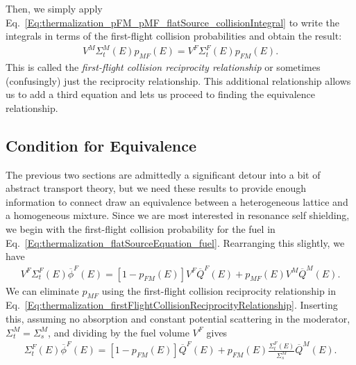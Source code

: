 Then, we simply apply Eq.~\eqref{Eq:thermalization_pFM_pMF_flatSource_collisionIntegral} to write the integrals in terms of the first-flight collision probabilities and obtain the result:
\begin{align}
  V^M \Sigma_t^M(E)  p_{MF}(E)  = V^F \Sigma_t^F(E) p_{FM}(E). \label{Eq:thermalization_firstFlightCollisionReciprocityRelationship}
\end{align}
This is called the \emph{first-flight collision reciprocity relationship} or sometimes (confusingly) just the reciprocity relationship. This additional relationship allows us to add a third equation and lets us proceed to finding the equivalence relationship.

\subsection{Condition for Equivalence}

The previous two sections are admittedly a significant detour into a bit of abstract transport theory, but we need these results to provide enough information to connect draw an equivalence between a heterogeneous lattice and a homogeneous mixture. Since we are most interested in resonance self shielding, we begin with the first-flight collision probability for the fuel in Eq.~\eqref{Eq:thermalization_flatSourceEquation_fuel}. Rearranging this slightly, we have
\begin{align}
   V^F \Sigma_t^F(E) \overline{\phi}^F(E) = [ 1 - p_{FM}(E) ] V^F \overline{Q}^F(E) + p_{MF}(E) V^M \overline{Q}^M(E) .
\end{align}
We can eliminate $p_{MF}$ using the first-flight collision reciprocity relationship in Eq.~\eqref{Eq:thermalization_firstFlightCollisionReciprocityRelationship}. Inserting this, assuming no absorption and constant potential scattering in the moderator, $\Sigma_t^M = \Sigma_s^M$, and dividing by the fuel volume $V^F$ gives
\begin{align}
  \Sigma_t^F(E) \overline{\phi}^F(E) = [ 1 - p_{FM}(E) ] \overline{Q}^F(E) + p_{FM}(E) \frac{\Sigma_t^F(E)}{\Sigma_s^M} \overline{Q}^M(E) .
\end{align}

